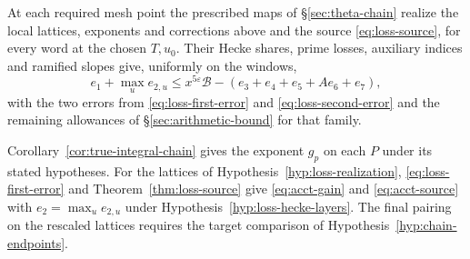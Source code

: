\begin{hypothesis}[\openinput]\label{hyp:loss-realization}
At each required mesh point the prescribed maps of \S\ref{sec:theta-chain}
realize the local lattices, exponents and corrections above
and the source \eqref{eq:loss-source}, for every word at the chosen
$T,u_0$. Their Hecke shares, prime losses, auxiliary indices and
ramified slopes give, uniformly on the windows,
\[
 e_1+\max_u e_{2,u}
 \le x^{5\varepsilon}\mathcal B-(e_3+e_4+e_5+A e_6+e_7),
\]
with the two errors from \eqref{eq:loss-first-error} and
\eqref{eq:loss-second-error} and the remaining allowances of
\S\ref{sec:arithmetic-bound} for that family.
\end{hypothesis}

Corollary~\ref{cor:true-integral-chain} gives the exponent $g_p$ on
each $P$ under its stated hypotheses. For the lattices of
Hypothesis~\ref{hyp:loss-realization}, \eqref{eq:loss-first-error} and
Theorem~\ref{thm:loss-source} give \eqref{eq:acct-gain} and
\eqref{eq:acct-source} with $e_2=\max_u e_{2,u}$ under
Hypothesis~\ref{hyp:loss-hecke-layers}. The final pairing on the
rescaled lattices requires the target comparison of
Hypothesis~\ref{hyp:chain-endpoints}.
